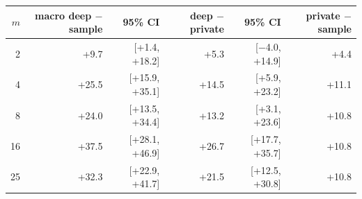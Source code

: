 \begin{tabular}{rrrrrr}
\toprule
$m$ & macro deep $-$ sample & 95\% CI & deep $-$ private & 95\% CI & private $-$ sample \\ \midrule
2 & +9.7 & [+1.4, +18.2] & +5.3 & [$-$4.0, +14.9] & +4.4 \\
4 & +25.5 & [+15.9, +35.1] & +14.5 & [+5.9, +23.2] & +11.1 \\
8 & +24.0 & [+13.5, +34.4] & +13.2 & [+3.1, +23.6] & +10.8 \\
16 & +37.5 & [+28.1, +46.9] & +26.7 & [+17.7, +35.7] & +10.8 \\
25 & +32.3 & [+22.9, +41.7] & +21.5 & [+12.5, +30.8] & +10.8 \\
\bottomrule
\end{tabular}

